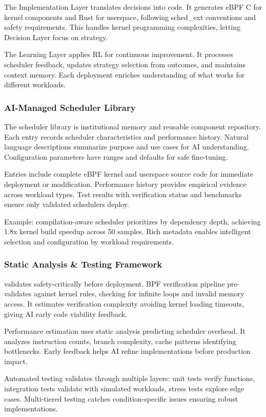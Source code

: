 The Implementation Layer translates decisions into code. It generates eBPF C for kernel components and Rust for userspace, following sched\_ext conventions and safety requirements. This handles kernel programming complexities, letting Decision Layer focus on strategy.

The Learning Layer applies RL for continuous improvement. It processes scheduler feedback, updates strategy selection from outcomes, and maintains context memory. Each deployment enriches understanding of what works for different workloads.

\subsubsection{AI-Managed Scheduler Library}
The scheduler library is institutional memory and reusable component repository. Each entry records scheduler characteristics and performance history. Natural language descriptions summarize purpose and use cases for AI understanding. Configuration parameters have ranges and defaults for safe fine-tuning.

Entries include complete eBPF kernel and userspace source code for immediate deployment or modification. Performance history provides empirical evidence across workload types. Test results with verification status and benchmarks ensure only validated schedulers deploy.

Example: compilation-aware scheduler prioritizes by dependency depth, achieving 1.8x kernel build speedup across 50 samples. Rich metadata enables intelligent selection and configuration by workload requirements.

\subsubsection{Static Analysis \& Testing Framework}
\sys validates safety-critically before deployment. BPF verification pipeline pre-validates against kernel rules, checking for infinite loops and invalid memory access. It estimates verification complexity avoiding kernel loading timeouts, giving AI early code viability feedback.

Performance estimation uses static analysis predicting scheduler overhead. It analyzes instruction counts, branch complexity, cache patterns identifying bottlenecks. Early feedback helps AI refine implementations before production impact.

Automated testing validates through multiple layers: unit tests verify functions, integration tests validate with simulated workloads, stress tests explore edge cases. Multi-tiered testing catches condition-specific issues ensuring robust implementations.

